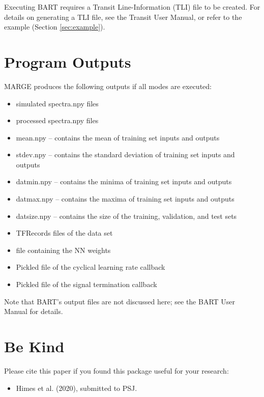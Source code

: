 \documentclass[letterpaper, 12pt]{article}
\begin{document}
\noindent  Executing BART requires a Transit Line-Information (TLI) file to 
be created.  For details on generating a TLI file, see the Transit User Manual, 
or refer to the example (Section \ref{sec:example}).



\section{Program Outputs}
\label{sec:outputs}

MARGE produces the following outputs if all modes are executed:

\begin{itemize}
\item simulated spectra.npy files
\item processed spectra.npy files
\item mean.npy -- contains the mean of training set inputs and outputs
\item stdev.npy -- contains the standard deviation of training set inputs and 
                   outputs
\item datmin.npy -- contains the minima of training set inputs and outputs
\item datmax.npy -- contains the maxima of training set inputs and outputs
\item datsize.npy -- contains the size of the training, validation, and test 
                     sets
\item TFRecords files of the data set
\item file containing the NN weights
\item Pickled file of the cyclical learning rate callback
\item Pickled file of the signal termination callback
\end{itemize}

\noindent Note that BART's output files are not discussed here; see the BART 
User Manual for details.



\section{Be Kind}
\label{sec:bekind}
Please cite this paper if you found this package useful for your
research:

\begin{itemize}
\item Himes et al. (2020), submitted to PSJ.
\end{itemize}
\end{document}
